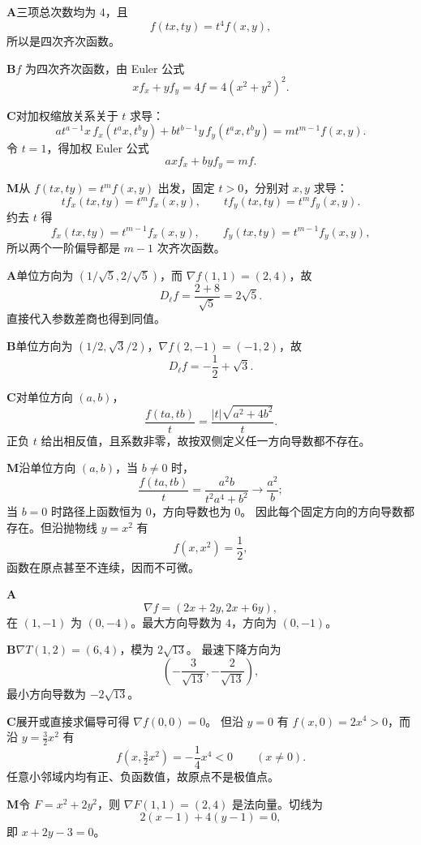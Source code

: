 \begin{solutionBox}
\textbf{A}\quad 三项总次数均为 \(4\)，且
\[
f(tx,ty)=t^4f(x,y),
\]
所以是四次齐次函数。

\textbf{B}\quad \(f\) 为四次齐次函数，由 Euler 公式
\[
xf_x+yf_y=4f=4(x^2+y^2)^2.
\]

\textbf{C}\quad 对加权缩放关系关于 \(t\) 求导：
\[
a t^{a-1}x\,f_x(t^ax,t^by)
+b t^{b-1}y\,f_y(t^ax,t^by)
=m t^{m-1}f(x,y).
\]
令 \(t=1\)，得加权 Euler 公式
\[
a x f_x+b y f_y=m f.
\]

\textbf{M}\quad 从
\(f(tx,ty)=t^m f(x,y)\) 出发，固定 \(t>0\)，分别对 \(x,y\) 求导：
\[
t f_x(tx,ty)=t^m f_x(x,y),\qquad
t f_y(tx,ty)=t^m f_y(x,y).
\]
约去 \(t\) 得
\[
f_x(tx,ty)=t^{m-1}f_x(x,y),\qquad
f_y(tx,ty)=t^{m-1}f_y(x,y),
\]
所以两个一阶偏导都是 \(m-1\) 次齐次函数。
\end{solutionBox}

\begin{solutionBox}
\textbf{A}\quad 单位方向为 \((1/\sqrt5,2/\sqrt5)\)，而
\(\nabla f(1,1)=(2,4)\)，故
\[
D_{\ell}f=\frac{2+8}{\sqrt5}=2\sqrt5.
\]
直接代入参数差商也得到同值。

\textbf{B}\quad 单位方向为
\((1/2,\sqrt3/2)\)，\(\nabla f(2,-1)=(-1,2)\)，故
\[
D_\ell f=-\frac12+\sqrt3.
\]

\textbf{C}\quad 对单位方向 \((a,b)\)，
\[
\frac{f(ta,tb)}t
=\frac{|t|\sqrt{a^2+4b^2}}t.
\]
正负 \(t\) 给出相反值，且系数非零，故按双侧定义任一方向导数都不存在。

\textbf{M}\quad 沿单位方向 \((a,b)\)，当 \(b\ne0\) 时，
\[
\frac{f(ta,tb)}t
=\frac{a^2b}{t^2a^4+b^2}\longrightarrow\frac{a^2}{b};
\]
当 \(b=0\) 时路径上函数恒为 \(0\)，方向导数也为 \(0\)。
因此每个固定方向的方向导数都存在。但沿抛物线 \(y=x^2\) 有
\[
f(x,x^2)=\frac12,
\]
函数在原点甚至不连续，因而不可微。
\end{solutionBox}

\begin{solutionBox}
\textbf{A}\quad
\[
\nabla f=(2x+2y,2x+6y),
\]
在 \((1,-1)\) 为 \((0,-4)\)。最大方向导数为 \(4\)，方向为 \((0,-1)\)。

\textbf{B}\quad \(\nabla T(1,2)=(6,4)\)，模为 \(2\sqrt{13}\)。
最速下降方向为
\[
\left(-\frac3{\sqrt{13}},-\frac2{\sqrt{13}}\right),
\]
最小方向导数为 \(-2\sqrt{13}\)。

\textbf{C}\quad 展开或直接求偏导可得 \(\nabla f(0,0)=0\)。
但沿 \(y=0\) 有 \(f(x,0)=2x^4>0\)，而沿
\(y=\tfrac32x^2\) 有
\[
f\left(x,\tfrac32x^2\right)=-\frac14x^4<0
\qquad(x\ne0).
\]
任意小邻域内均有正、负函数值，故原点不是极值点。

\textbf{M}\quad 令 \(F=x^2+2y^2\)，则
\(\nabla F(1,1)=(2,4)\) 是法向量。切线为
\[
2(x-1)+4(y-1)=0,
\]
即 \(x+2y-3=0\)。
\end{solutionBox}

